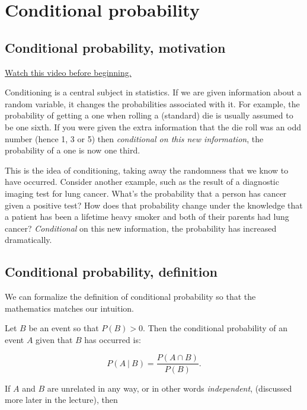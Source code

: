 \documentclass[]{article}
\begin{document}
\newpage

\section{Conditional probability}\label{conditional-probability}

\subsection{Conditional probability,
motivation}\label{conditional-probability-motivation}

\href{http://youtu.be/u6AH6qsSVA4?list=PLpl-gQkQivXiBmGyzLrUjzsblmQsLtkzJ}{Watch
this video before beginning.}

Conditioning is a central subject in statistics. If we are given
information about a random variable, it changes the probabilities
associated with it. For example, the probability of getting a one when
rolling a (standard) die is usually assumed to be one sixth. If you were
given the extra information that the die roll was an odd number (hence
1, 3 or 5) then \emph{conditional on this new information}, the
probability of a one is now one third.

This is the idea of conditioning, taking away the randomness that we
know to have occurred. Consider another example, such as the result of a
diagnostic imaging test for lung cancer. What's the probability that a
person has cancer given a positive test? How does that probability
change under the knowledge that a patient has been a lifetime heavy
smoker and both of their parents had lung cancer? \emph{Conditional} on
this new information, the probability has increased dramatically.

\subsection{Conditional probability,
definition}\label{conditional-probability-definition}

We can formalize the definition of conditional probability so that the
mathematics matches our intuition.

Let $B$ be an event so that $P(B) > 0$. Then the conditional probability
of an event $A$ given that $B$ has occurred is:

\[
P(A ~|~ B) = \frac{P(A \cap B)}{P(B)}.
\]

If $A$ and $B$ are unrelated in any way, or in other words
\emph{independent}, (discussed more later in the lecture), then
\end{document}
